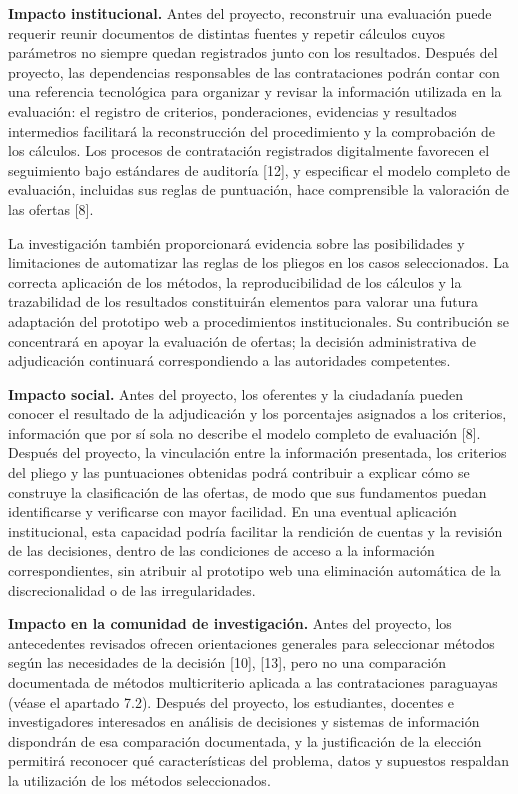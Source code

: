 \documentclass[12pt,a4paper]{article}
\begin{document}
\textbf{Impacto institucional.} Antes del proyecto, reconstruir una evaluación puede requerir reunir documentos de distintas fuentes y repetir cálculos cuyos parámetros no siempre quedan registrados junto con los resultados. Después del proyecto, las dependencias responsables de las contrataciones podrán contar con una referencia tecnológica para organizar y revisar la información utilizada en la evaluación: el registro de criterios, ponderaciones, evidencias y resultados intermedios facilitará la reconstrucción del procedimiento y la comprobación de los cálculos. Los procesos de contratación registrados digitalmente favorecen el seguimiento bajo estándares de auditoría [12], y especificar el modelo completo de evaluación, incluidas sus reglas de puntuación, hace comprensible la valoración de las ofertas [8].

La investigación también proporcionará evidencia sobre las posibilidades y limitaciones de automatizar las reglas de los pliegos en los casos seleccionados. La correcta aplicación de los métodos, la reproducibilidad de los cálculos y la trazabilidad de los resultados constituirán elementos para valorar una futura adaptación del prototipo web a procedimientos institucionales. Su contribución se concentrará en apoyar la evaluación de ofertas; la decisión administrativa de adjudicación continuará correspondiendo a las autoridades competentes.

\textbf{Impacto social.} Antes del proyecto, los oferentes y la ciudadanía pueden conocer el resultado de la adjudicación y los porcentajes asignados a los criterios, información que por sí sola no describe el modelo completo de evaluación [8]. Después del proyecto, la vinculación entre la información presentada, los criterios del pliego y las puntuaciones obtenidas podrá contribuir a explicar cómo se construye la clasificación de las ofertas, de modo que sus fundamentos puedan identificarse y verificarse con mayor facilidad. En una eventual aplicación institucional, esta capacidad podría facilitar la rendición de cuentas y la revisión de las decisiones, dentro de las condiciones de acceso a la información correspondientes, sin atribuir al prototipo web una eliminación automática de la discrecionalidad o de las irregularidades.

\textbf{Impacto en la comunidad de investigación.} Antes del proyecto, los antecedentes revisados ofrecen orientaciones generales para seleccionar métodos según las necesidades de la decisión [10], [13], pero no una comparación documentada de métodos multicriterio aplicada a las contrataciones paraguayas (véase el apartado 7.2). Después del proyecto, los estudiantes, docentes e investigadores interesados en análisis de decisiones y sistemas de información dispondrán de esa comparación documentada, y la justificación de la elección permitirá reconocer qué características del problema, datos y supuestos respaldan la utilización de los métodos seleccionados.
\end{document}
